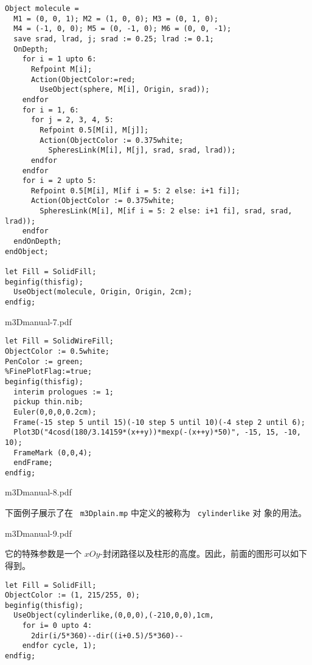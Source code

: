 \documentclass[a4paper,12pt]{article}
\begin{document}
\begin{verbatim}
Object molecule =
  M1 = (0, 0, 1); M2 = (1, 0, 0); M3 = (0, 1, 0);
  M4 = (-1, 0, 0); M5 = (0, -1, 0); M6 = (0, 0, -1);
  save srad, lrad, j; srad := 0.25; lrad := 0.1;
  OnDepth;
    for i = 1 upto 6:
      Refpoint M[i];
      Action(ObjectColor:=red;
        UseObject(sphere, M[i], Origin, srad));
    endfor
    for i = 1, 6:
      for j = 2, 3, 4, 5:
        Refpoint 0.5[M[i], M[j]];
        Action(ObjectColor := 0.375white;
          SpheresLink(M[i], M[j], srad, srad, lrad));
      endfor
    endfor
    for i = 2 upto 5:
      Refpoint 0.5[M[i], M[if i = 5: 2 else: i+1 fi]];
      Action(ObjectColor := 0.375white;
        SpheresLink(M[i], M[if i = 5: 2 else: i+1 fi], srad, srad, lrad));
    endfor
  endOnDepth;
endObject;

let Fill = SolidFill;
beginfig(thisfig);
  UseObject(molecule, Origin, Origin, 2cm);
endfig;
\end{verbatim}
\centerline{\XeTeXpdffile m3Dmanual-7.pdf}

\begin{verbatim}
let Fill = SolidWireFill;
ObjectColor := 0.5white;
PenColor := green;
%FinePlotFlag:=true;
beginfig(thisfig);
  interim prologues := 1;
  pickup thin.nib;
  Euler(0,0,0,0.2cm);
  Frame(-15 step 5 until 15)(-10 step 5 until 10)(-4 step 2 until 6);
  Plot3D("4cosd(180/3.14159*(x++y))*mexp(-(x++y)*50)", -15, 15, -10, 10);
  FrameMark (0,0,4);
  endFrame;
endfig;
\end{verbatim}
\centerline{\XeTeXpdffile m3Dmanual-8.pdf}

下面例子展示了在 ~{\tt m3Dplain.mp} 中定义的被称为 ~{\tt cylinderlike} 对
象的用法。

\centerline{\XeTeXpdffile m3Dmanual-9.pdf}

 它的特殊参数是一个 $xOy$-封闭路径以及柱形的高度。因此，前面的图形可以如下
得到。 
\begin{verbatim}
let Fill = SolidFill;
ObjectColor := (1, 215/255, 0);
beginfig(thisfig);
  UseObject(cylinderlike,(0,0,0),(-210,0,0),1cm,
    for i= 0 upto 4:
      2dir(i/5*360)--dir((i+0.5)/5*360)--
    endfor cycle, 1);
endfig;
\end{verbatim}
\end{document}
